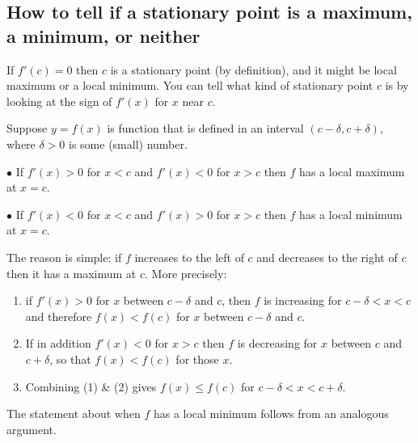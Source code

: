 \subsection{How to tell if a stationary point is a maximum, a minimum, or neither} %
\label{sec:isitamaxormin}
If $f'(c)=0$ then $c$ is a stationary point (by definition), and it might be
local maximum or a local minimum.  You can tell what kind of stationary point
$c$ is by looking at the sign of $f'(x)$ for $x$ near $c$.




\begin{theorem}\label{thm:max-min-test}
  Suppose $y=f(x)$ is function that is defined in an interval
  $(c-\delta, c+\delta)$, where $\delta>0$ is some (small) number.
  \begin{trivlist}
  \item[$\bullet$] If $f'(x)>0$ for $x<c$ and $f'(x)<0$ for $x>c$ then $f$ has a
    local maximum at $x=c$.
  \item[$\bullet$] If $f'(x)<0$ for $x<c$ and $f'(x)>0$ for $x>c$ then $f$ has a
    local minimum at $x=c$.
  \end{trivlist}
\end{theorem}%
\marginpar{\sffamily\itshape\footnotesize%
   \\
   }
\smallskip




The reason is simple: if $f$ increases to the left of $c$ and decreases to the
right of $c$ then it has a maximum at $c$.  More precisely:




\begin{enumerate}




\item if $f'(x)>0$ for $x$ between $c-\delta$ and $c$, then $f$ is
  increasing for $c-\delta<x<c$ and therefore $f(x)<f(c)$ for $x$
  between $c-\delta$ and $c$.








\item If in addition $f'(x)<0$ for $x>c$ then $f$ is decreasing for
  $x$ between $c$ and $c+\delta$, so that $f(x)<f(c)$ for those $x$.

\item Combining (1) \& (2) gives $f(x)\leq f(c)$ for
  $c-\delta<x<c+\delta$.
\end{enumerate}
The statement about when $f$ has a local minimum follows from an analogous argument.


